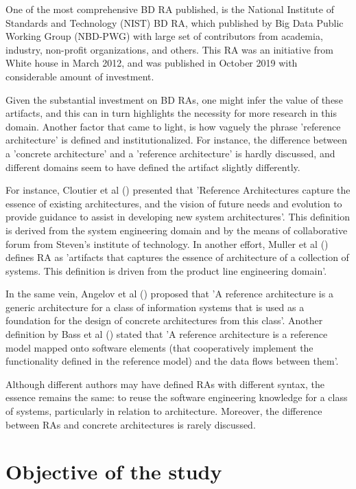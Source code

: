 \documentclass{ieeeaccess}
\begin{document}
One of the most comprehensive BD RA published, is the National Institute of Standards and Technology (NIST) BD RA, which published by Big Data Public Working Group (NBD-PWG) with large set of contributors from academia, industry, non-profit organizations, and others. This RA was an initiative from White house in March 2012, and was published in October 2019 with considerable amount of investment. 

Given the substantial investment on BD RAs, one might infer the value of these artifacts, and this can in turn highlights the necessity for more research in this domain. Another factor that came to light, is how vaguely the phrase 'reference architecture' is defined and institutionalized. For instance, the difference between a 'concrete architecture' and a 'reference architecture' is hardly discussed, and different domains seem to have defined the artifact slightly differently. 

For instance, Cloutier et al (\cite{Cloutier}) presented that 'Reference Architectures capture the essence of existing architectures, and the vision of future needs and evolution to provide guidance to assist in developing new system architectures'. This definition is derived from the system engineering domain and by the means of collaborative forum from Steven's institute of technology. In another effort, Muller et al (\cite{muller2008reference}) defines RA as 'artifacts that captures the essence of architecture of a collection of systems. This definition is driven from the product line engineering domain'. 

In the same vein, Angelov et al (\cite{angelov2009classification}) proposed that 'A reference architecture is a generic architecture for a class of information systems that is used as a foundation for the design of concrete architectures from this class'. Another definition by Bass et al (\cite{Bass}) stated that 'A reference architecture is a reference model mapped onto software elements (that cooperatively implement the functionality defined in the reference model) and the data flows between them'. 

Although different authors may have defined RAs with different syntax, the essence remains the same: to reuse the software engineering knowledge for a class of systems, particularly in relation to architecture. Moreover, the difference between RAs and concrete architectures is rarely discussed. 

\section{Objective of the study}
\end{document}
